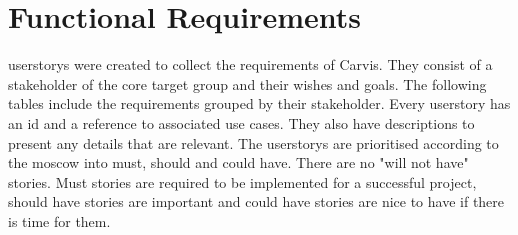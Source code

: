 \chapter{Functional Requirements}

\Glspl{userstory} were created to collect the requirements of Carvis. They consist of a \gls{stakeholder} of the core target group and their wishes and goals. The following tables include the requirements grouped by their \gls{stakeholder}. Every \gls{userstory} has an id and a reference to associated use cases. They also have descriptions to present any details that are relevant. The \glspl{userstory} are prioritised according to the \gls{moscow} into must, should and could have. There are no "will not have" stories. Must stories are required to be implemented for a successful project, should have stories are important and could have stories are nice to have if there is time for them. 

